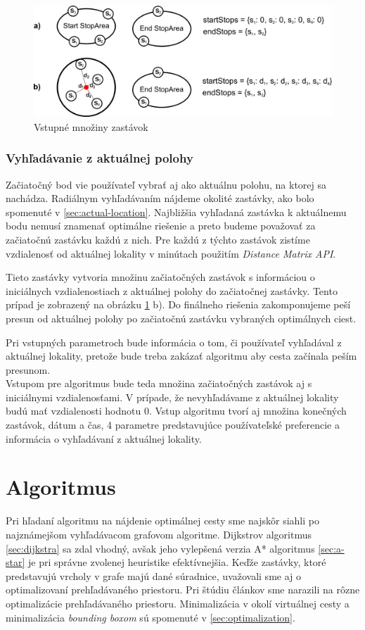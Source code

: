\begin{figure}[H]
\centerline{\includegraphics[width=1.0\textwidth]{images/initial-parameters}}
\caption[Vstupné množiny zasáavok]{Vstupné množiny zastávok}
\label{fig:initial-parameters}
\end{figure} 

\subsubsection{Vyhľadávanie z aktuálnej polohy}
Začiatočný bod vie používateľ vybrať aj ako aktuálnu polohu, na ktorej sa nachádza. Radiálnym vyhľadávaním nájdeme okolité zastávky, ako bolo spomenuté v \ref{sec:actual-location}. Najbližšia vyhľadaná zastávka k aktuálnemu bodu nemusí znamenať optimálne riešenie a preto budeme považovať za začiatočnú zastávku každú z nich. Pre každú z týchto zastávok zistíme vzdialenosť od aktuálnej lokality  v minútach použitím \textit{Distance Matrix API}. 

Tieto zastávky vytvoria množinu začiatočných zastávok s informáciou o iniciálnych vzdialenostiach z aktuálnej polohy do začiatočnej zastávky. Tento prípad je zobrazený na obrázku \ref{fig:initial-parameters} b). Do finálneho riešenia zakomponujeme peší presun od aktuálnej polohy po začiatočnú zastávku vybraných optimálnych ciest. 

Pri vstupných parametroch bude informácia o tom, či používateľ vyhľadával z aktuálnej lokality, pretože bude treba zakázať algoritmu aby cesta začínala peším presunom. 
\\

Vstupom pre algoritmus bude teda množina začiatočných zastávok aj s iniciálnymi vzdialenosťami. V prípade, že nevyhľadávame z aktuálnej lokality  budú mať vzdialenosti hodnotu 0. Vstup algoritmu tvorí aj množina konečných zastávok, dátum a čas, 4 parametre predstavujúce používateľské preferencie a informácia o vyhľadávaní z aktuálnej lokality.

\section{Algoritmus}
Pri hľadaní algoritmu na nájdenie optimálnej cesty sme najskôr siahli po najznámejšom vyhľadávacom grafovom algoritme. Dijkstrov algoritmus \ref{sec:dijkstra} sa zdal vhodný, avšak jeho vylepšená verzia A* algoritmus \ref{sec:a-star} je pri správne zvolenej heuristike efektívnejšia. Keďže zastávky, ktoré predstavujú vrcholy v grafe majú dané súradnice, uvažovali sme aj o optimalizovaní prehľadávaného priestoru. Pri štúdiu článkov sme narazili na rôzne optimalizácie prehľadávaného priestoru. Minimalizácia v okolí virtuálnej cesty a minimalizácia \textit{bounding boxom} sú spomenuté v \ref{sec:optimalization}.

